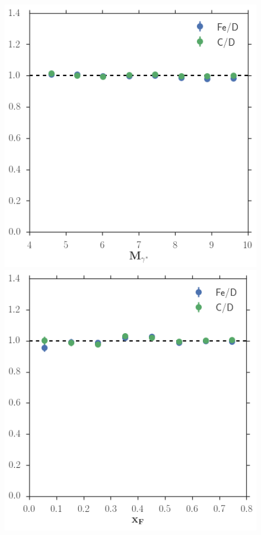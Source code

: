 \begin{figure}
	\includegraphics[height=0.3\textheight]{figures/analysis/mass-acceptance.png}\hfill
	\includegraphics[height=0.3\textheight]{figures/analysis/xf-acceptance.png} \\

\end{figure}
